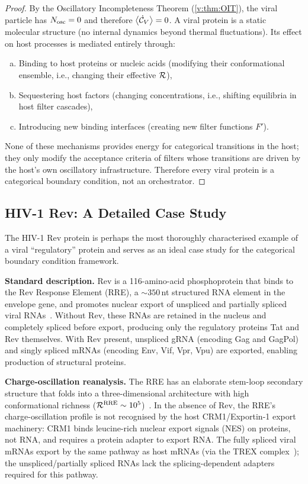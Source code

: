 \begin{proof}
By the Oscillatory Incompleteness Theorem (\cref{v:thm:OIT}), the viral particle has $N_{\mathrm{osc}} = 0$ and therefore $\left\langle \dot{\mathcal{C}}_V \right\rangle = 0$. A viral protein is a static molecular structure (no internal dynamics beyond thermal fluctuations). Its effect on host processes is mediated entirely through:
\begin{enumerate}[(a)]
  \item Binding to host proteins or nucleic acids (modifying their conformational ensemble, i.e., changing their effective $\mathcal{R}$),
  \item Sequestering host factors (changing concentrations, i.e., shifting equilibria in host filter cascades),
  \item Introducing new binding interfaces (creating new filter functions $F'$).
\end{enumerate}
None of these mechanisms provides energy for categorical transitions in the host; they only modify the acceptance criteria of filters whose transitions are driven by the host's own oscillatory infrastructure. Therefore every viral protein is a categorical boundary condition, not an orchestrator.
\end{proof}

\subsection{HIV-1 Rev: A Detailed Case Study}

The HIV-1 Rev protein is perhaps the most thoroughly characterised example of a viral ``regulatory'' protein and serves as an ideal case study for the categorical boundary condition framework.

\textbf{Standard description.} Rev is a 116-amino-acid phosphoprotein that binds to the Rev Response Element (RRE), a $\sim\!350$\,nt structured RNA element in the envelope gene, and promotes nuclear export of unspliced and partially spliced viral RNAs~\cite{Malim1989,Cullen1998}. Without Rev, these RNAs are retained in the nucleus and completely spliced before export, producing only the regulatory proteins Tat and Rev themselves. With Rev present, unspliced gRNA (encoding Gag and GagPol) and singly spliced mRNAs (encoding Env, Vif, Vpr, Vpu) are exported, enabling production of structural proteins.

\textbf{Charge-oscillation reanalysis.} The RRE has an elaborate stem-loop secondary structure that folds into a three-dimensional architecture with high conformational richness ($\mathcal{R}^{\mathrm{RRE}} \sim 10^5$)~\cite{Bai2014}. In the absence of Rev, the RRE's charge-oscillation profile is not recognised by the host CRM1/Exportin-1 export machinery: CRM1 binds leucine-rich nuclear export signals (NES) on proteins, not RNA, and requires a protein adapter to export RNA. The fully spliced viral mRNAs export by the same pathway as host mRNAs (via the TREX complex~\cite{Strasser2002}); the unspliced/partially spliced RNAs lack the splicing-dependent adapters required for this pathway.

